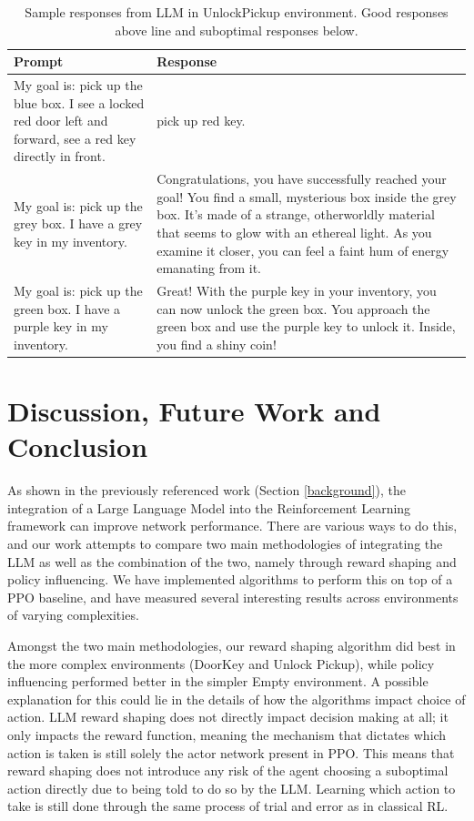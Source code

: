 \documentclass[conference]{IEEEtran}
\begin{document}
\begin{table}[h]
\caption{Sample responses from LLM in UnlockPickup environment. Good responses above line and suboptimal responses below.}
\begin{center}
\label{unlockpickupresponses}
\begin{tabularx}{3.25in}{X | X}
Prompt & Response \\
\hline
My goal is: pick up the blue box. I see a locked red door left and forward, see a red key directly in front. & pick up red key. \\
\hline
My goal is: pick up the grey box. I have a grey key in my inventory. & Congratulations, you have successfully reached your goal! You find a small, mysterious box inside the grey box. It's made of a strange, otherworldly material that seems to glow with an ethereal light. As you examine it closer, you can feel a faint hum of energy emanating from it. \\
My goal is: pick up the green box. I have a purple key in my inventory. & Great! With the purple key in your inventory, you can now unlock the green box. You approach the green box and use the purple key to unlock it. Inside, you find a shiny coin!
\end{tabularx}
\end{center}
\end{table}


\section{Discussion, Future Work and Conclusion}

As shown in the previously referenced work (Section \ref{background}), the integration of a Large Language Model into the Reinforcement Learning framework can improve network performance. There are various ways to do this, and our work attempts to compare two main methodologies of integrating the LLM as well as the combination of the two, namely through reward shaping and policy influencing. We have implemented algorithms to perform this on top of a PPO baseline, and have measured several interesting results across environments of varying complexities.

Amongst the two main methodologies, our reward shaping algorithm did best in the more complex environments (DoorKey and Unlock Pickup), while policy influencing performed better in the simpler Empty environment. A possible explanation for this could lie in the details of how the algorithms impact choice of action. LLM reward shaping does not directly impact decision making at all; it only impacts the reward function, meaning the mechanism that dictates which action is taken is still solely the actor network present in PPO. This means that reward shaping does not introduce any risk of the agent choosing a suboptimal action directly due to being told to do so by the LLM. Learning which action to take is still done through the same process of trial and error as in classical RL.
\end{document}
